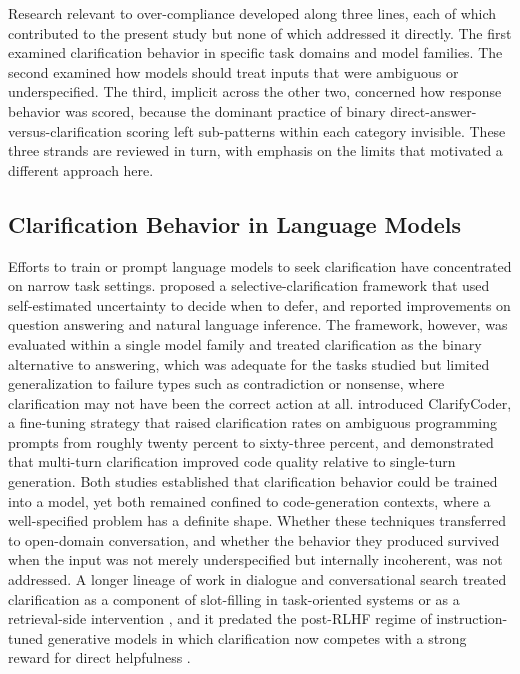 \documentclass[10pt]{article}
\begin{document}
Research relevant to over-compliance developed along three lines, each of which contributed to the present study but none of which addressed it directly. The first examined clarification behavior in specific task domains and model families. The second examined how models should treat inputs that were ambiguous or underspecified. The third, implicit across the other two, concerned how response behavior was scored, because the dominant practice of binary direct-answer-versus-clarification scoring left sub-patterns within each category invisible. These three strands are reviewed in turn, with emphasis on the limits that motivated a different approach here.

\subsection{Clarification Behavior in Language Models}

Efforts to train or prompt language models to seek clarification have concentrated on narrow task settings. \citet{zhang2025clam} proposed a selective-clarification framework that used self-estimated uncertainty to decide when to defer, and reported improvements on question answering and natural language inference. The framework, however, was evaluated within a single model family and treated clarification as the binary alternative to answering, which was adequate for the tasks studied but limited generalization to failure types such as contradiction or nonsense, where clarification may not have been the correct action at all. \citet{wu2025clarifycoder} introduced ClarifyCoder, a fine-tuning strategy that raised clarification rates on ambiguous programming prompts from roughly twenty percent to sixty-three percent, and \citet{mu2023clarifygpt} demonstrated that multi-turn clarification improved code quality relative to single-turn generation. Both studies established that clarification behavior could be trained into a model, yet both remained confined to code-generation contexts, where a well-specified problem has a definite shape. Whether these techniques transferred to open-domain conversation, and whether the behavior they produced survived when the input was not merely underspecified but internally incoherent, was not addressed. A longer lineage of work in dialogue and conversational search treated clarification as a component of slot-filling in task-oriented systems \citep{williams2016dialog,budzianowski2018multiwoz} or as a retrieval-side intervention \citep{aliannejadi2019asking,zamani2020generating,keyvan2022how}, and it predated the post-RLHF regime of instruction-tuned generative models in which clarification now competes with a strong reward for direct helpfulness \citep{wei2022finetuned,ouyang2022training,askell2021general}.
\end{document}
